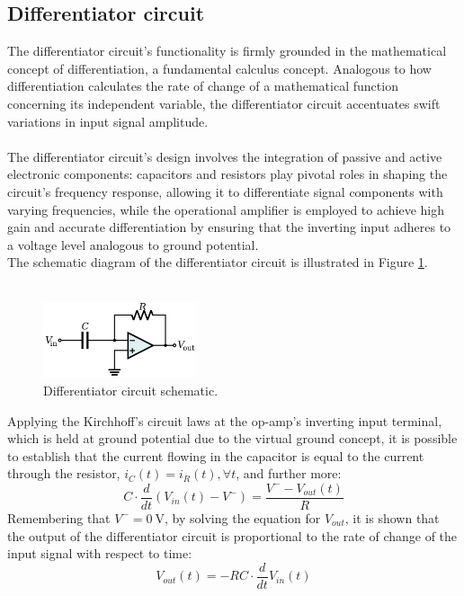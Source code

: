 	\subsection{Differentiator circuit}
		The differentiator circuit's functionality is firmly grounded in the mathematical concept of differentiation, a fundamental calculus concept.
		Analogous to how differentiation calculates the rate of change of a mathematical function concerning its independent variable, 
		the differentiator circuit accentuates swift variations in input signal amplitude. \\\\
		The differentiator circuit's design involves the integration of passive and active electronic components:
		capacitors and resistors play pivotal roles in shaping the circuit's frequency response, allowing it to differentiate signal components with varying frequencies, 
		while the operational amplifier is employed to achieve high gain and accurate differentiation by ensuring that the inverting input adheres to a voltage level analogous to ground potential. \\
		The schematic diagram of the differentiator circuit is illustrated in Figure \ref{fig:differentiator_circuit}. \\\\
		\begin{figure}[H]
		    \centering
		    \includegraphics[width=0.4\textwidth]{figures/differentiator/circuit.png}
		    \caption{Differentiator circuit schematic.}
		    \label{fig:differentiator_circuit}
		\end{figure}
		\noindent 
		Applying the Kirchhoff's circuit laws at the op-amp's inverting input terminal, which is held at ground potential due to the virtual ground concept, 
		it is possible to establish that the current flowing in the capacitor is equal to the current through the resistor, $i_C(t) = i_R(t), \forall t$, and further more: 
		$$ C \cdot \frac{d}{dt}(V_{in}(t) - V^-) = \frac{V^- - V_{out}(t)}{R} $$
		Remembering that $V^- = \SI{0}{\volt}$, by solving the equation for $V_{out}$, 
		it is shown that the output of the differentiator circuit is proportional to the rate of change of the input signal with respect to time: $$ V_{out}(t) = - RC \cdot \frac{d}{dt}V_{in}(t) $$
		
